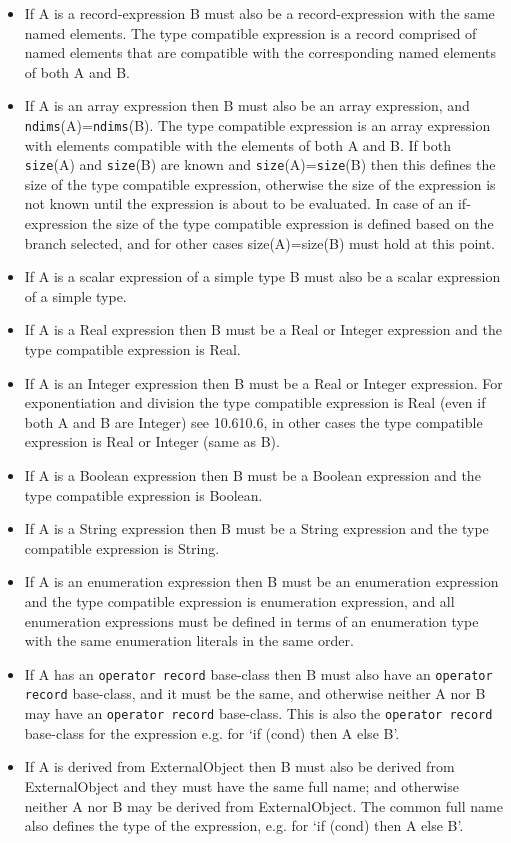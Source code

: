 \begin{itemize}
\item
  If A is a record-expression B must also be a record-expression with
  the same named elements. The type compatible expression is a record
  comprised of named elements that are compatible with the corresponding
  named elements of both A and B.
\item
  If A is an array expression then B must also be an array expression,
  and \lstinline[basicstyle=\ttfamily]!ndims!(A)=\lstinline[basicstyle=\ttfamily]!ndims!(B). The type compatible expression is an array
  expression with elements compatible with the elements of both A and B.
  If both \lstinline[basicstyle=\ttfamily]!size!(A) and \lstinline[basicstyle=\ttfamily]!size!(B) are known
	and \lstinline[basicstyle=\ttfamily]!size!(A)=\lstinline[basicstyle=\ttfamily]!size!(B) then this
  defines the size of the type compatible expression, otherwise the size
  of the expression is not known until the expression is about to be
  evaluated. In case of an if-expression the size of the type compatible
  expression is defined based on the branch selected, and for other
  cases size(A)=size(B) must hold at this point.
\item
  If A is a scalar expression of a simple type B must also be a scalar
  expression of a simple type.
\item
  If A is a Real expression then B must be a Real or Integer expression
  and the type compatible expression is Real.
\item
  If A is an Integer expression then B must be a Real or Integer
  expression. For exponentiation and division the type compatible
  expression is Real (even if both A and B are Integer) see 10.610.6, in
  other cases the type compatible expression is Real or Integer (same as
  B).
\item
  If A is a Boolean expression then B must be a Boolean expression and
  the type compatible expression is Boolean.
\item
  If A is a String expression then B must be a String expression and the
  type compatible expression is String.
\item
  If A is an enumeration expression then B must be an enumeration
  expression and the type compatible expression is enumeration
  expression, and all enumeration expressions must be defined in terms
  of an enumeration type with the same enumeration literals in the same
  order.
\item
  If A has an \lstinline[basicstyle=\ttfamily]!operator record! base-class then B must also have an
  \lstinline[basicstyle=\ttfamily]!operator record! base-class, and it must be the same, and otherwise
  neither A nor B may have an \lstinline[basicstyle=\ttfamily]!operator record! base-class. This is also
  the \lstinline[basicstyle=\ttfamily]!operator record! base-class for the expression e.g. for `if (cond)
  then A else B'.
\item
  If A is derived from ExternalObject then B must also be derived from
  ExternalObject and they must have the same full name; and otherwise
  neither A nor B may be derived from ExternalObject. The common full
  name also defines the type of the expression, e.g. for `if (cond) then
  A else B'.
\end{itemize}
